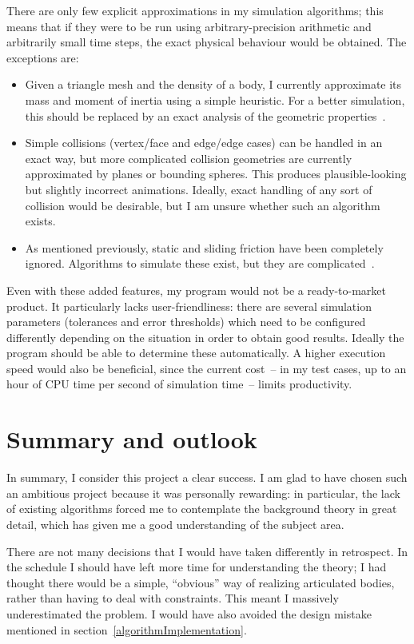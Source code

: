 There are only few explicit approximations in my simulation algorithms; this means that if they
were to be run using arbitrary-precision arithmetic and arbitrarily small time steps, the exact
physical behaviour would be obtained. The exceptions are:
\begin{itemize}
\item Given a triangle mesh and the density of a body, I currently approximate its mass and moment
    of inertia using a simple heuristic. For a better simulation, this should be
    replaced by an exact analysis of the geometric properties~\cite{Mirtich:96}.
\item Simple collisions (vertex/face and edge/edge cases) can be handled in an exact way, but
    more complicated collision geometries are currently approximated by planes or bounding
    spheres. This produces plausible-looking but slightly incorrect animations. Ideally,
    exact handling of any sort of collision would be desirable, but I am unsure whether such
    an algorithm exists.
\item As mentioned previously, static and sliding friction have been completely ignored.
    Algorithms to simulate these exist, but they are complicated~\cite{Baraff:PhD}.
\end{itemize}

Even with these added features, my program would not be a ready-to-market product. It particularly
lacks user-friendliness: there are several simulation parameters (tolerances and error thresholds)
which need to be configured differently depending on the situation in order to obtain good
results. Ideally the program should be able to determine these automatically. A higher execution
speed would also be beneficial, since the current cost~-- in my test cases, up to an hour of CPU
time per second of simulation time~-- limits productivity.

\section{Summary and outlook}

In summary, I consider this project a clear success. I am glad to have chosen such an ambitious
project because it was personally rewarding: in particular, the lack of existing algorithms
forced me to contemplate the background theory in great detail, which has given me a good
understanding of the subject area.

There are not many decisions that I would have taken differently in retrospect. In the schedule I
should have left more time for understanding the theory; I had thought there would be a simple,
``obvious'' way of realizing articulated bodies, rather than having to deal with constraints. This
meant I massively underestimated the problem. I would have also avoided the design mistake
mentioned in section~\ref{algorithmImplementation}.

